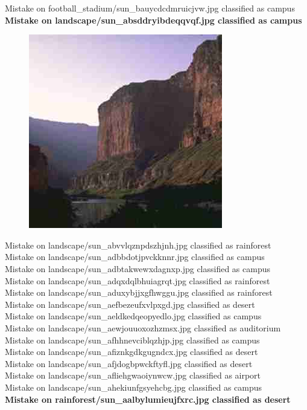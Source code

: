 \documentclass[12pt]{article}
\begin{document}
Mistake on football\_stadium/sun\_bauycdcdmruicjvw.jpg classified as campus \\
{\bf Mistake on landscape/sun\_absddryibdeqqvqf.jpg classified as campus \\}
\begin{figure}
\centering
\includegraphics[width=0.5\linewidth]{../dat/landscape/sun_absddryibdeqqvqf.jpg}
\end{figure}
Mistake on landscape/sun\_abvvlqznpdszhjnh.jpg classified as rainforest \\
Mistake on landscape/sun\_adbbdotjpvckknnr.jpg classified as campus \\
Mistake on landscape/sun\_adbtakwewxdagnxp.jpg classified as campus \\
Mistake on landscape/sun\_adqxdqlbhuiagrqt.jpg classified as rainforest \\
Mistake on landscape/sun\_aduxybjjxgfhwggu.jpg classified as rainforest \\
Mistake on landscape/sun\_aefbezeufxvlpxgd.jpg classified as desert \\
Mistake on landscape/sun\_aeldkedqeopyedlo.jpg classified as campus \\
Mistake on landscape/sun\_aewjouuoxozhzmsx.jpg classified as auditorium \\
Mistake on landscape/sun\_afhhnevciblqzhjp.jpg classified as campus \\
Mistake on landscape/sun\_afiznkgdkgugndcx.jpg classified as desert \\
Mistake on landscape/sun\_afjdogbpwckftyfl.jpg classified as desert \\
Mistake on landscape/sun\_afliehgwaoiynwcw.jpg classified as airport \\
Mistake on landscape/sun\_ahekiunfgsyehcbg.jpg classified as campus \\
{\bf Mistake on rainforest/sun\_aalbylumieujfxrc.jpg classified as desert \\}
\end{document}
